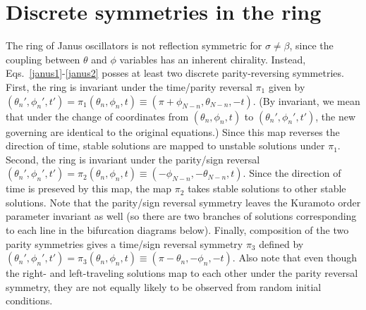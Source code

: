 \documentclass[aps,pre,amsmath,amssymb,floatfix,onecolumn,notitlepage,10pt]{revtex4-1}
\begin{document}
\section{Discrete symmetries in the ring}
The ring of Janus oscillators is not reflection symmetric for $\sigma \neq \beta$, since the coupling between $\theta$ and $\phi$ variables has an inherent chirality. Instead, Eqs.~\eqref{janus1}-\eqref{janus2} posses at least two discrete parity-reversing symmetries. First, the ring is invariant under the time/parity reversal $\pi_1$ given by $(\theta_n',\phi_n',t') = \pi_1(\theta_n,\phi_n,t) \equiv (\pi+\phi_{N-n},\theta_{N-n},-t)$. (By invariant, we mean that under the change of coordinates from $(\theta_n,\phi_n,t)$ to $(\theta_n',\phi_n',t')$, the new governing are identical to the original equations.)
Since this map reverses the direction of time, stable solutions are mapped to unstable solutions under $\pi_1$.  Second, the ring is invariant under the parity/sign reversal $(\theta_n',\phi_n',t') = \pi_2(\theta_n,\phi_n,t) \equiv (-\phi_{N-n},-\theta_{N-n},t)$. Since the direction of time is preseved by this map, the map $\pi_2$ takes stable solutions to other stable solutions.  Note that the parity/sign reversal symmetry leaves the Kuramoto order parameter invariant as well (so there are two branches of solutions corresponding to each line in the bifurcation diagrams below). Finally, composition of the two parity symmetries gives a time/sign reversal symmetry $\pi_3$ defined by $(\theta_n',\phi_n',t')=\pi_3(\theta_n,\phi_n,t)\equiv(\pi-\theta_n,-\phi_n,-t)$. Also note that even though the right- and left-traveling solutions map to each other under the parity reversal symmetry, they are not equally likely to be observed from random initial conditions.
\end{document}
